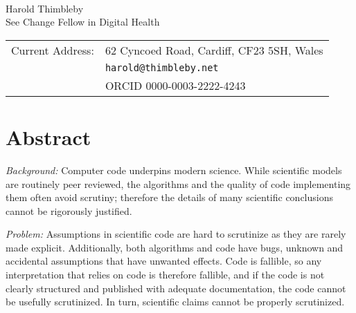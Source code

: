 






\linenumbers

\vspace*{0.2in}

\begin{flushleft}
\begin{change}
{\Large
\textbf\newline{\mytitle} %
}
\end{change}
\newline
\\
Harold Thimbleby
\\
\bigskip
See Change Fellow in Digital Health
\\
\bigskip

\begin{tabular}{@{}ll}Current Address: &62 Cyncoed Road, Cardiff, CF23 5SH, Wales\\
&\texttt{harold@thimbleby.net}\\
&ORCID 0000-0003-2222-4243
\end{tabular}


\end{flushleft}
\section*{Abstract}
\noindent
\emph{Background:} Computer code underpins modern science. While scientific models are routinely peer reviewed, the algorithms and the quality of code implementing them often avoid scrutiny; therefore the details of many scientific conclusions cannot be rigorously justified. 

\noindent\emph{Problem:} Assumptions in scientific code are hard to scrutinize as they are rarely made explicit. Additionally, both algorithms and code have bugs, unknown and accidental assumptions that have unwanted effects. Code is fallible, so any interpretation that relies on code is therefore fallible, and if the code is not clearly structured and published with adequate documentation, the code cannot be usefully scrutinized. In turn, scientific claims cannot be properly scrutinized.

